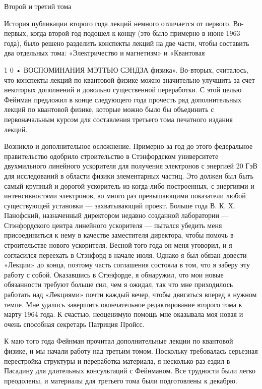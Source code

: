 \documentclass[10pt,oneside]{article}
\begin{document}
Второй и третий тома\par

История публикации второго года лекций немного отличается от первого. Во-первых, когда второй год подошел к концу (это было примерно в июне 1963 года), было решено разделить конспекты лекций на две части, чтобы составить два отдельных тома: «Электричество и магнетизм» и «Квантовая\par

1 0 • ВОСПОМИНАНИЯ МЭТТЬЮ СЭНДЗА физика». Во-вторых, считалось, что конспекты лекций по квантовой физике можно значительно улучшить за счет некоторых дополнений и довольно существенной переработки. С этой целью Фейнман предложил в конце следующего года прочесть ряд дополнительных лекций по квантовой физике, которые можно было бы объединить с первоначальным курсом для составления третьего тома печатного издания лекций.\par

Возникло и дополнительное осложнение. Примерно за год до этого федеральное правительство одобрило строительство в Стэнфордском университете двухмильного линейного ускорителя для получения электронов с энергией 20 ГэВ для исследований в области физики элементарных частиц. Это должен был быть самый крупный и дорогой ускоритель из когда-либо построенных, с энергиями и интенсивностями электронов, во много раз превышающими показатели любой существующей установки --- захватывающий проект. Больше года В. К. Х. Панофский, назначенный директором недавно созданной лаборатории --- Стэнфордского центра линейного ускорителя --- пытался убедить меня присоединиться к нему в качестве заместителя директора, чтобы помочь в строительстве нового ускорителя. Весной того года он меня уговорил, и я согласился переехать в Стэнфорд в начале июля. Однако я был обязан довести «Лекции» до конца, поэтому часть соглашения состояла в том, что я заберу эту работу с собой. Оказавшись в Стэнфорде, я обнаружил, что мои новые обязанности требуют больше сил, чем я ожидал, так что мне приходилось работать над «Лекциями» почти каждый вечер, чтобы двигаться вперед в нужном темпе. Мне удалось завершить окончательное редактирование второго тома к марту 1964 года. К счастью, неоценимую помощь мне оказывала моя новая и очень способная секретарь Патриция Пройсс.\par

К маю того года Фейнман прочитал дополнительные лекции по квантовой физике, и мы начали работу над третьим томом. Поскольку требовалась серьезная перестройка структуры и переработка материала, я несколько раз ездил в Пасадину для длительных консультаций с Фейнманом. Все трудности были легко преодолены, и материалы для третьего тома были подготовлены к декабрю.\par
\end{document}
